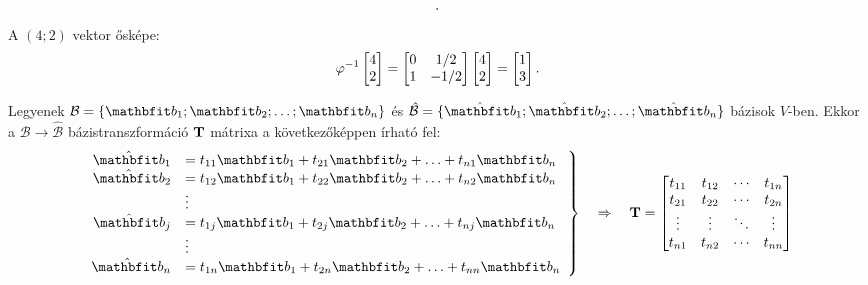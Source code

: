 \documentclass{szb-practice}
\begin{document}
\begin{example}
$$    \text.
  $$
  A $(4;2)$ vektor ősképe:
  \vspace{-1em}
  $$
    \varphi^{-1} \begin{bmatrix} 4 \\ 2 \end{bmatrix}
    = \begin{bmatrix}
      0 & 1/2  \\
      1 & -1/2
    \end{bmatrix} \begin{bmatrix}
      4 \\ 2
    \end{bmatrix}
    = \begin{bmatrix}
      1 \\ 3
    \end{bmatrix}
    \text.
  $$
\end{example}

\begin{definition}[Bázistranszformáció][nobreak]
  Legyenek $\mathcal B = \{ \rvec b_1; \rvec b_2; \ldots; \rvec b_n \}$ és
  $\hat{\mathcal B} = \{ \hat{\rvec b}_1; \hat{\rvec b}_2; \ldots;
    \hat{\rvec b}_n \}$ bázisok $V$-ben. Ekkor a $\mathcal B \rightarrow
    \hat{\mathcal B}$ bázistranszformáció $\mathbf{T}$ mátrixa a következőképpen
  írható fel:
  $$
    \left.\begin{array}{rl}
      \hat{\rvec b}_1 & = t_{11} \rvec b_1 + t_{21} \rvec b_2 + \ldots + t_{n1} \rvec b_n \\
      \hat{\rvec b}_2 & = t_{12} \rvec b_1 + t_{22} \rvec b_2 + \ldots + t_{n2} \rvec b_n \\
                      & \vdots                                                            \\
      \hat{\rvec b}_j & = t_{1j} \rvec b_1 + t_{2j} \rvec b_2 + \ldots + t_{nj} \rvec b_n \\
                      & \vdots                                                            \\
      \hat{\rvec b}_n & = t_{1n} \rvec b_1 + t_{2n} \rvec b_2 + \ldots + t_{nn} \rvec b_n
    \end{array}\right\}
    \quad\Rightarrow\quad
    \rmat T = \begin{bmatrix}
      t_{11} & t_{12} & \cdots & t_{1n} \\
      t_{21} & t_{22} & \cdots & t_{2n} \\
      \vdots & \vdots & \ddots & \vdots \\
      t_{n1} & t_{n2} & \cdots & t_{nn}
    \end{bmatrix}
  $$
\end{definition}
\end{document}
